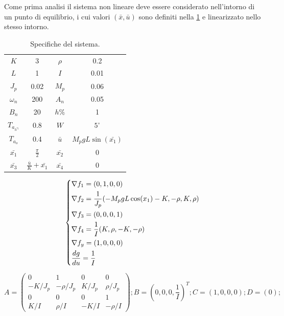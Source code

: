 \documentclass[a4paper]{article}
\newenvironment{eqsys}{\begin{equation}\begin{dcases}}{\end{dcases}\end{equation}}
\begin{document}
Come prima analisi il sistema non lineare deve essere considerato nell’intorno di un punto di equilibrio, i cui valori $(\bar{x}, \bar{u})$ sono definiti nella \cref{table:ref_val} e linearizzato nello stesso intorno.


{\begin{table}[h]

    \centering 

    \begin{tabular}{| c | c || c | c |}
        
        $K$ & 3 &
        $\rho$ & 0.2 \\
        $L$ & 1 &
        $I$ & 0.01 \\
        $J_p$ & 0.02 &
        $M_p$ & 0.06 \\
        $\omega_n$ & 200 &
        $A_n$ & 0.05 \\
        $B_n$ & 20 &
        $h\%$ & 1 \\
        $T_{a_{h^\%}}$ & 0.8 &
        $W$ & $5^\circ$ \\
        $T_{a_o}$ & 0.4 &
        $\bar{u}$  & $M_p g L \sin(\bar{x_1})$ \\
        $\bar{x_1}$  & $\frac{\pi}{2}$ &
        $\bar{x_2}$  & 0 \\
        $\bar{x_3}$  &$\frac{\bar{u}}{K} + \bar{x_1}$ &
        $\bar{x_4}$  & 0
        
        
    \end{tabular}
    \caption{Specifiche del sistema.}
        \label{table:ref_val}
\end{table}
}
\begin{eqsys}       
        \nabla f_1  = (0, 1, 0, 0) \\
        \nabla f_2  = \frac{1}{J_p} (-M_p g L \cos(x_1) - K, - \rho, K, \rho) \\
        \nabla f_3  =  (0, 0, 0, 1)\\
        \nabla f_4  =  \frac{1}{I} (K, \rho, -K, -\rho) \\
        \nabla f_y  =  (1, 0, 0, 0)  \\
        \frac{dg}{du}  =  \frac{1}{I}
        \label{eqn:linearization_calc}
    \end{eqsys}

\begin{equation}
    \label{eqn:linearization}
A = \begin{pmatrix}0 & 1 & 0 & 0 \\
    -K/J_p & -\rho/J_p & K/J_p & \rho/J_p \\
    0    &   0    &   0    &   1\\
    K/I  & \rho/I & -K/I &-\rho/I
\end{pmatrix};
B = (0, 0, 0, \frac{1}{I})^T;
C = (1, 0, 0, 0);
D = (0);
\end{equation}
\end{document}
